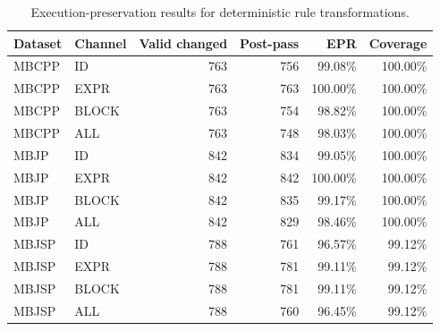 \begin{table}[t]
\centering
\small
\begin{tabular}{llrrrr}
\toprule
Dataset & Channel & Valid changed & Post-pass & EPR & Coverage \\
\midrule
MBCPP & ID & 763 & 756 & 99.08\% & 100.00\% \\
MBCPP & EXPR & 763 & 763 & 100.00\% & 100.00\% \\
MBCPP & BLOCK & 763 & 754 & 98.82\% & 100.00\% \\
MBCPP & ALL & 763 & 748 & 98.03\% & 100.00\% \\
MBJP & ID & 842 & 834 & 99.05\% & 100.00\% \\
MBJP & EXPR & 842 & 842 & 100.00\% & 100.00\% \\
MBJP & BLOCK & 842 & 835 & 99.17\% & 100.00\% \\
MBJP & ALL & 842 & 829 & 98.46\% & 100.00\% \\
MBJSP & ID & 788 & 761 & 96.57\% & 99.12\% \\
MBJSP & EXPR & 788 & 781 & 99.11\% & 99.12\% \\
MBJSP & BLOCK & 788 & 781 & 99.11\% & 99.12\% \\
MBJSP & ALL & 788 & 760 & 96.45\% & 99.12\% \\
\bottomrule
\end{tabular}
\caption{Execution-preservation results for deterministic rule transformations.}
\label{tab:rq2-epr}
\end{table}
